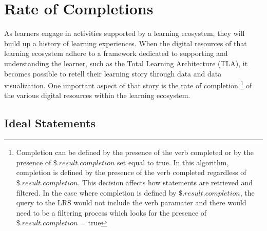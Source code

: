 \documentclass{article}
\begin{document}
\section{Rate of Completions}

As learners engage in activities supported by a learning ecosystem, they will build
up a history of learning experiences. When the digital resources of that learning ecosystem
adhere to a framework dedicated to supporting and understanding the
learner, such as the Total Learning Architecture (TLA), it becomes
possible to retell their learning story through data and data visualization. One important aspect of
that story is the rate of completion
\footnote{\label{defOfCompletion} Completion can be defined by the
  presence of the verb completed or by the presence of
  $\$.result.completion$ set equal to true. In this algorithm,
  completion is defined by the presence of the verb completed
  regardless of $\$.result.completion$. This decision affects how
  statements are retrieved and filtered. In the case where completion
  is defined by $\$.result.completion$, the query to the LRS would not
  include the verb paramater and there would need to be a filtering
  process which looks for the presence of $\$.result.completion$ =
  true} of the various digital resources within the learning
ecosystem.

\subsection{Ideal Statements}
\end{document}

